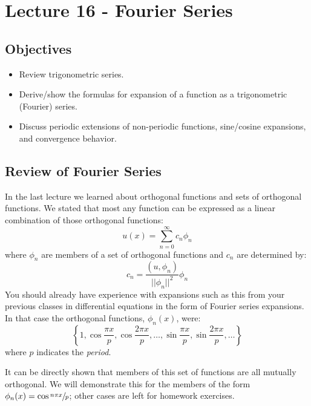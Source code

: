 \chapter{Lecture 16 - Fourier Series}
\label{ch:lec16}
\section{Objectives}
\begin{itemize}
\item Review trigonometric series.
\item Derive/show the formulas for expansion of a function as a trigonometric (Fourier) series.
\item Discuss periodic extensions of non-periodic functions, sine/cosine expansions, and convergence behavior.
\end{itemize}

\section{Review of Fourier Series}
In the last lecture we learned about orthogonal functions and sets of orthogonal functions.  We stated that most any function can be expressed as a linear combination of those orthogonal functions:
\begin{equation*}
u(x) = \sum\limits_{n=0}^{\infty} c_n \phi_n
\end{equation*}
where $\phi_n$ are members of a set of orthogonal functions and $c_n$ are determined by:
\begin{equation*}
c_n = \frac{(u,\phi_n)}{||\phi_n||^2}\phi_n
\end{equation*} 
You should already have experience with expansions such as this from your previous classes in differential equations in the form of Fourier series expansions.  In that case the orthogonal functions, $\phi_n(x)$, were:
\begin{equation*}
\left\{1,\cos{\frac{\pi x}{p}},\cos{\frac{2\pi x}{p}},\dots,\sin{\frac{\pi x}{p}}, \sin{\frac{2\pi x}{p}}, \dots \right\}
\end{equation*}
where $p$ indicates the \emph{period}. 

It can be directly shown that members of this set of functions are all mutually orthogonal.  We will demonstrate this for the members of the form $\phi_n(x) = \cos{\sfrac{n \pi x}{p}}$; other cases are left for homework exercises.

